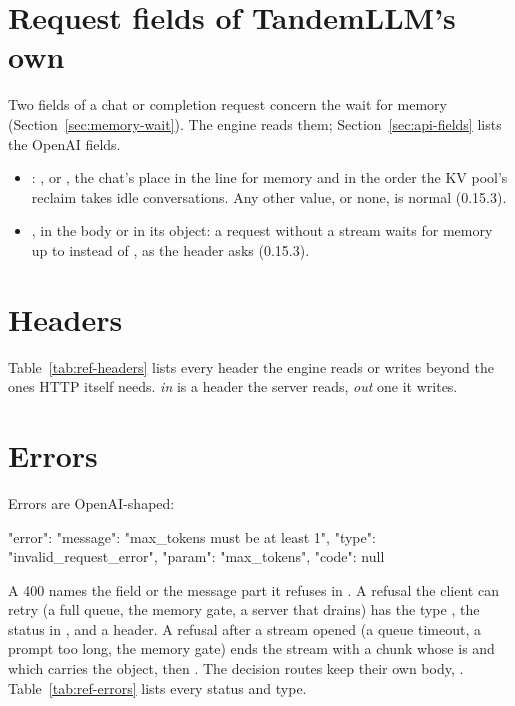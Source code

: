 

\section{Request fields of TandemLLM's own}\label{sec:ref-tandem-fields}

Two fields of a chat or completion request concern the wait for memory (Section~\ref{sec:memory-wait}). The engine reads them; Section~\ref{sec:api-fields} lists the OpenAI fields.

\begin{itemize}
\item {}: ,  or , the chat's place in the line for memory and in the order the KV pool's reclaim takes idle conversations. Any other value, or none, is normal (0.15.3).
\item {}, in the body or in its  object: a request without a stream waits for memory up to  instead of , as the header  asks (0.15.3).
\end{itemize}

\section{Headers}

Table~\ref{tab:ref-headers} lists every header the engine reads or writes beyond the ones HTTP itself needs. \emph{in} is a header the server reads, \emph{out} one it writes.



\section{Errors}

Errors are OpenAI-shaped:

\begin{jsonc}
{"error": {"message": "max_tokens must be at least 1", "type": "invalid_request_error",
           "param": "max_tokens", "code": null}}
\end{jsonc}

A 400 names the field or the message part it refuses in . A refusal the client can retry (a full queue, the memory gate, a server that drains) has the type , the status in , and a  header. A refusal after a stream opened (a queue timeout, a prompt too long, the memory gate) ends the stream with a chunk whose  is  and which carries the  object, then \code{[DONE]}. The decision routes keep their own body, . Table~\ref{tab:ref-errors} lists every status and type.



